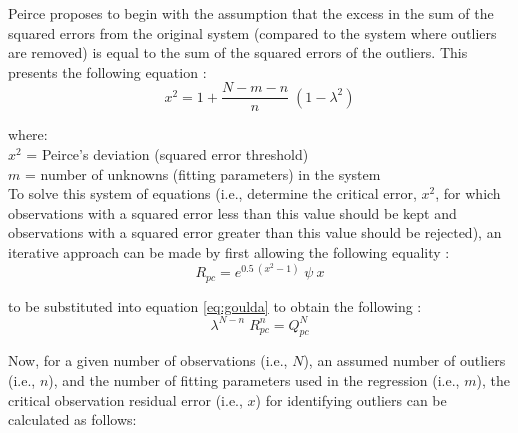 Peirce proposes to begin with the assumption that the excess in the sum of the squared errors from the original system (compared to the system where outliers are removed) is equal to the sum of the squared errors of the outliers.  
This presents the following equation \parencite[Eq. C]{gould55}:
\begin{equation}
\label{eq:gouldc}
    x^{2} = 1 + \frac{N-m-n}{n}\; \left(1 - \lambda^{2}\right)
\end{equation}

\noindent where: \\
\indent $x^{2}$ = Peirce's deviation (squared error threshold) \\
\indent $m$ = number of unknowns (fitting parameters) in the system \\

To solve this system of equations (i.e., determine the critical error, $x^{2}$, for which observations with a squared error less than this value should be kept and observations with a squared error greater than this value should be rejected), an iterative approach can be made by first allowing the following equality \parencite[Eq. D]{gould55}:
\begin{equation}
\label{eq:gouldd}
    R_{pc} = e^{0.5\:(x^2-1)}\; \psi\: x
\end{equation}

\noindent to be substituted into equation \ref{eq:goulda} to obtain the following \parencite[Eq. A$'$]{gould55}:
\begin{equation}
\label{eq:gouldap}
    \lambda^{N-n}\; R_{pc}^{n} = Q_{pc}^{N}
\end{equation}

\noindent Now, for a given number of observations (i.e., $N$), an assumed number of outliers (i.e., $n$), and the number of fitting parameters used in the regression (i.e., $m$), the critical observation residual error (i.e., $x$) for identifying outliers can be calculated as follows:

